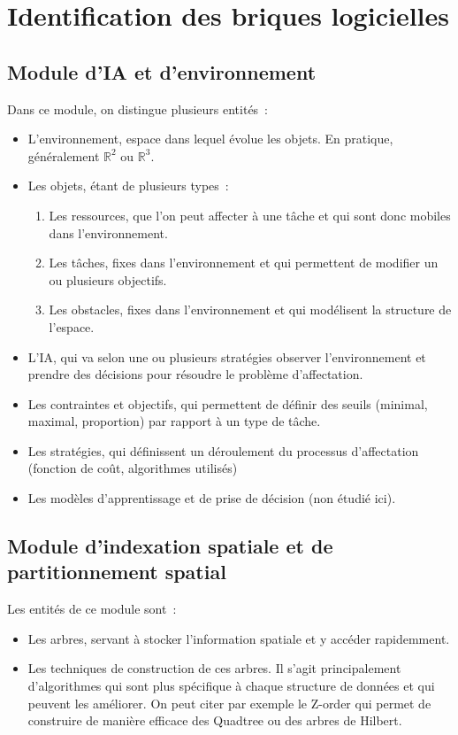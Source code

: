 \section{Identification des briques logicielles}

%
\subsection{Module d'IA et d'environnement}

Dans ce module, on distingue plusieurs entités~:
\renewcommand{\labelitemi}{$\bullet$}
\begin{itemize}
\setlength{\itemsep}{5pt}
\item L'environnement, espace dans lequel évolue les objets. En pratique, généralement $\mathbb{R}^2$ ou $\mathbb{R}^3$.
\item Les objets, étant de plusieurs types~:
	\begin{enumerate}
	\item Les ressources, que l'on peut affecter à une tâche et qui sont donc mobiles dans l'environnement.
	\item Les tâches, fixes dans l'environnement et qui permettent de modifier un ou plusieurs objectifs.
	\item Les obstacles, fixes dans l'environnement et qui modélisent la structure de l'espace.
	\end{enumerate}
\item L'IA, qui va selon une ou plusieurs stratégies observer l'environnement et prendre des décisions pour résoudre le problème d'affectation.
\item Les contraintes et objectifs, qui permettent de définir des seuils (minimal, maximal, proportion) par rapport à un type de tâche.
\item Les stratégies, qui définissent un déroulement du processus d'affectation (fonction de coût, algorithmes utilisés)
\item Les modèles d'apprentissage et de prise de décision (non étudié ici).
\end{itemize} %

%
\subsection{Module d'indexation spatiale et de partitionnement spatial}

Les entités de ce module sont~:
\begin{itemize}
\setlength{\itemsep}{5pt}
\item Les arbres, servant à stocker l'information spatiale et y accéder rapidemment.
\item Les techniques de construction de ces arbres. Il s'agit principalement d'algorithmes qui sont plus spécifique à chaque structure de données et qui peuvent les améliorer. On peut citer par exemple le Z-order qui permet de construire de manière efficace des Quadtree ou des arbres de Hilbert.
\end{itemize}

